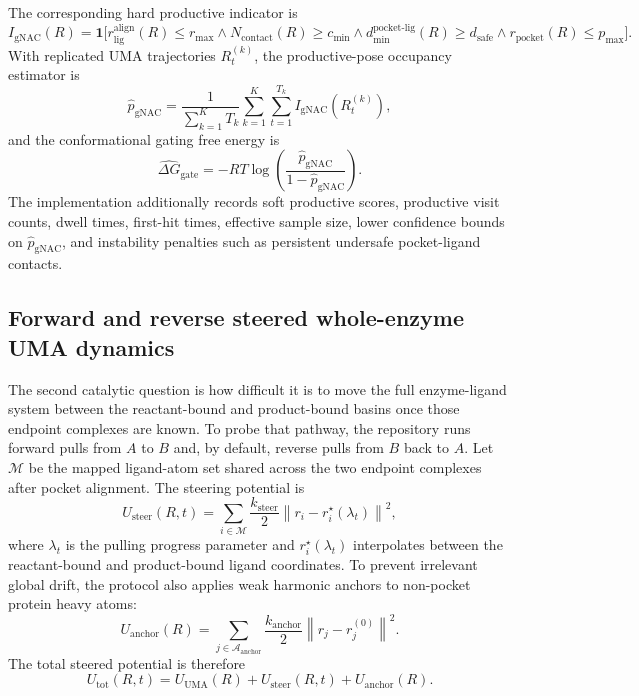 \documentclass[11pt]{article}
\begin{document}
	The corresponding hard productive indicator is
	\begin{equation}
		I_{\mathrm{gNAC}}(R)=
		\mathbf{1}\Big[
		r_{\mathrm{lig}}^{\mathrm{align}}(R)\le r_{\max}
		\wedge
		N_{\mathrm{contact}}(R)\ge c_{\min}
		\wedge
		d_{\min}^{\mathrm{pocket\text{-}lig}}(R)\ge d_{\mathrm{safe}}
		\wedge
		r_{\mathrm{pocket}}(R)\le p_{\max}
		\Big].
	\end{equation}
	With replicated UMA trajectories $R_t^{(k)}$, the productive-pose occupancy estimator is
	\begin{equation}
		\widehat p_{\mathrm{gNAC}}
		=
		\frac{1}{\sum_{k=1}^{K}T_k}
		\sum_{k=1}^{K}\sum_{t=1}^{T_k}
		I_{\mathrm{gNAC}}\!\left(R_t^{(k)}\right),
	\end{equation}
	and the conformational gating free energy is
	\begin{equation}
		\label{eq:ucatgate}
		\widehat{\Delta G}_{\mathrm{gate}}
		=
		-RT\log\!\left(
		\frac{\widehat p_{\mathrm{gNAC}}}{1-\widehat p_{\mathrm{gNAC}}}
		\right).
	\end{equation}
	The implementation additionally records soft productive scores, productive visit counts, dwell times, first-hit times, effective sample size, lower confidence bounds on $\widehat p_{\mathrm{gNAC}}$, and instability penalties such as persistent undersafe pocket-ligand contacts.
	
	\subsection{Forward and reverse steered whole-enzyme UMA dynamics}
	
	The second catalytic question is how difficult it is to move the full enzyme-ligand system between the reactant-bound and product-bound basins once those endpoint complexes are known. To probe that pathway, the repository runs forward pulls from $A$ to $B$ and, by default, reverse pulls from $B$ back to $A$. Let $\mathcal{M}$ be the mapped ligand-atom set shared across the two endpoint complexes after pocket alignment. The steering potential is
	\begin{equation}
		U_{\mathrm{steer}}(R,t)
		=
		\sum_{i\in\mathcal{M}}
		\frac{k_{\mathrm{steer}}}{2}
		\left\|
		r_i-r_i^\star(\lambda_t)
		\right\|^2,
	\end{equation}
	where $\lambda_t$ is the pulling progress parameter and $r_i^\star(\lambda_t)$ interpolates between the reactant-bound and product-bound ligand coordinates. To prevent irrelevant global drift, the protocol also applies weak harmonic anchors to non-pocket protein heavy atoms:
	\begin{equation}
		U_{\mathrm{anchor}}(R)
		=
		\sum_{j\in\mathcal{A}_{\mathrm{anchor}}}
		\frac{k_{\mathrm{anchor}}}{2}
		\left\|
		r_j-r_j^{(0)}
		\right\|^2.
	\end{equation}
	The total steered potential is therefore
	\begin{equation}
		U_{\mathrm{tot}}(R,t)=U_{\mathrm{UMA}}(R)+U_{\mathrm{steer}}(R,t)+U_{\mathrm{anchor}}(R).
	\end{equation}
	
\end{document}
